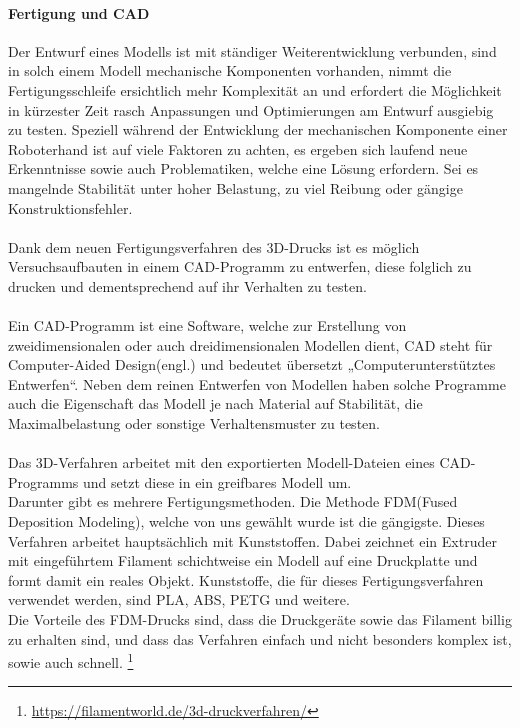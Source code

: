 \documentclass[titlepage,12pt,twoside]{article}
\begin{document}
\paragraph{Fertigung und CAD}
\label{par:Fertigung und CAD}
\hfill \break
\hfill \break
Der Entwurf eines Modells ist mit ständiger Weiterentwicklung verbunden, sind in 
solch einem Modell mechanische Komponenten vorhanden, nimmt die Fertigungsschleife 
ersichtlich mehr Komplexität an und erfordert die Möglichkeit in kürzester Zeit 
rasch Anpassungen und Optimierungen am Entwurf ausgiebig zu testen. Speziell 
während der Entwicklung der mechanischen Komponente einer Roboterhand ist auf 
viele Faktoren zu achten, es ergeben sich laufend neue Erkenntnisse sowie auch 
Problematiken, welche eine Lösung erfordern. Sei es mangelnde Stabilität unter 
hoher Belastung, zu viel Reibung oder gängige Konstruktionsfehler. \\
\\
Dank dem neuen Fertigungsverfahren des 3D-Drucks ist es möglich Versuchsaufbauten 
in einem CAD-Programm zu entwerfen, diese folglich zu drucken und dementsprechend 
auf ihr Verhalten zu testen. \\
\\
Ein CAD-Programm ist eine Software, welche zur Erstellung von zweidimensionalen 
oder auch dreidimensionalen Modellen dient, CAD steht für Computer-Aided 
Design(engl.) und bedeutet übersetzt „Computerunterstütztes Entwerfen“. Neben 
dem reinen Entwerfen von Modellen haben solche Programme auch die Eigenschaft 
das Modell je nach Material auf Stabilität, die Maximalbelastung oder sonstige 
Verhaltensmuster zu testen. \\
\\
Das 3D-Verfahren arbeitet mit den exportierten Modell-Dateien eines CAD-Programms 
und setzt diese in ein greifbares Modell um. \\
Darunter gibt es mehrere Fertigungsmethoden. Die Methode FDM(Fused Deposition Modeling), welche von uns gewählt wurde ist die 
gängigste. Dieses Verfahren arbeitet hauptsächlich 
mit Kunststoffen. Dabei zeichnet ein Extruder mit eingeführtem Filament schichtweise 
ein Modell auf eine Druckplatte und formt damit ein reales Objekt. Kunststoffe, 
die für dieses Fertigungsverfahren verwendet werden, sind PLA, ABS, PETG und weitere. \\
Die Vorteile des FDM-Drucks sind, dass die Druckgeräte sowie das Filament billig 
zu erhalten sind, und dass das Verfahren einfach und nicht besonders komplex 
ist, sowie auch schnell. \footnote{\url{https://filamentworld.de/3d-druckverfahren/}}\\
\end{document}
